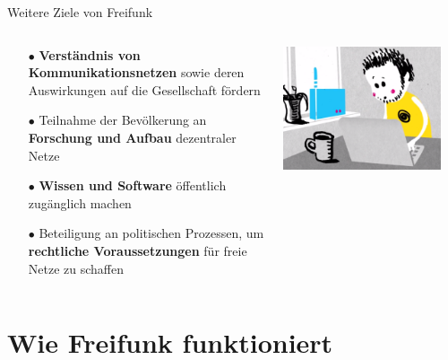 \documentclass[10pt]{beamer}
\begin{document}
  \begin{frame}{Weitere Ziele von Freifunk}
    \begin{columns}[T]
     \begin{column}{5cm}
        \begin{itemize}
          \item[\textcolor{freifunkpink}{\Large$\bullet$}] \textbf{Verständnis von Kommunikationsnetzen} sowie deren Auswirkungen auf die Gesellschaft fördern
          \item[\textcolor{freifunkpink}{\Large$\bullet$}] Teilnahme der Bevölkerung an \textbf{Forschung und Aufbau} dezentraler Netze
          \item[\textcolor{freifunkpink}{\Large$\bullet$}] \textbf{Wissen und Software} öffentlich zugänglich machen
          \item[\textcolor{freifunkpink}{\Large$\bullet$}] Beteiligung an politischen Prozessen, um \textbf{rechtliche Voraussetzungen} für freie Netze zu schaffen
        \end{itemize}
      \end{column}
      \begin{column}{5cm}
        \includegraphics[width=0.9\textwidth]{images/install}
      \end{column}
    \end{columns}
  \end{frame}

  \section{Wie Freifunk funktioniert}
\end{document}
